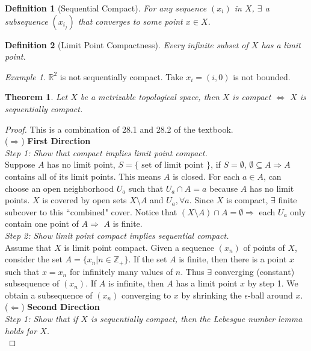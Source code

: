 \documentclass[article,11pt, reqno]{article}
\newtheorem*{theorem}{Theorem}
\newtheorem*{definition}{Definition}
\theoremstyle{remark}
\newtheorem*{example}{Example}
\newcommand{\R}{\mathbb{R}}
\newcommand{\Ra}{\Rightarrow}
\newcommand{\La}{\Leftarrow}
\newcommand{\Z}{\mathbb{Z}}
\newcommand{\<}{\langle}
\renewcommand{\>}{\rangle}
\newcommand{\ex}{\exists}
\begin{document}
\begin{definition}[Sequential Compact]
    For any sequence $(x_i)$ in $X$, $\exists$ a subsequence $(x_{i_j})$ that converges to some point $x\in X$.
\end{definition}
\begin{definition}[Limit Point Compactness]
    Every infinite subset of $X$ has a limit point.
\end{definition}
\begin{example}
    $\R^2$ is not sequentially compact. Take $x_i=(i,0)$ is not bounded. 
\end{example}
\begin{theorem}
    Let $X$ be a metrizable topological space, then $X$ is compact $\iff$ $X$ is sequentially compact.
\end{theorem}
\begin{proof} This is a combination of 28.1 and 28.2 of the textbook.\\
    ($\Ra$) \textbf{First Direction}\\
    \textit{Step 1: Show that compact implies limit point compact.}\\
    Suppose $A$ has no limit point, $S=\{\text{ set of limit point }\}$, if $S=\emptyset$, $\emptyset\subseteq A\Ra A$ contains all of its limit points. This means $A$ is closed. For each $a\in A$, can choose an open neighborhood $U_a$ such that $U_a\cap A=a$ because $A$ has no limit points. $X$ is covered by open sets $X\setminus A$ and $U_a,\forall a$. Since $X$ is compact, $\ex$ finite subcover to this ``combined" cover. Notice that $(X\setminus A)\cap A=\emptyset\Ra$ each $U_a$ only contain one point of $A\Ra$ $A$ is finite.\\
    \textit{Step 2: Show limit point compact implies sequential compact.}\\
    Assume that $X$ is limit point compact. Given a sequence $(x_n)$ of points of $X$, consider the set $A = \{x_n | n \in \Z_{+}\}$. If the set $A$ is finite, then there is a point $x$ such that $x = x_n$ for infinitely many values of $n$. Thus $\ex$ converging (constant) subsequence of $(x_n)$. If $A$ is infinite, then $A$ has a limit point $x$ by step 1. We obtain a subsequence of $(x_n)$ converging to $x$ by shrinking the $\epsilon$-ball around $x$.\\
    ($\La$) \textbf{Second Direction}\\
    \textit{Step 1: Show that if $X$ is sequentially compact, then the Lebesgue number lemma holds for $X$.}\\

\end{proof}
\end{document}

